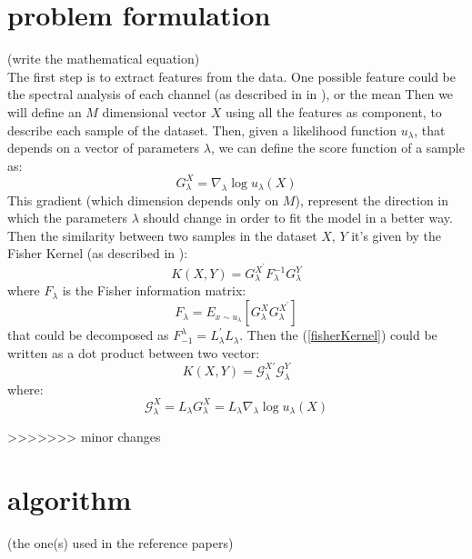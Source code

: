 \documentclass[final,leqno,onefignum,onetabnum]{siamltexmm}
\begin{document}
\section{problem formulation}
(write the mathematical equation)\\
The first step is to extract features from the data. One possible feature could be the spectral analysis of each channel (as described in in \cite{features1}), or the mean  Then we will define an $M$ dimensional vector $X$ using all the features as component, to describe each sample of the dataset. Then, given a likelihood function $u_\lambda$, that depends on  a vector of parameters $\lambda$, we can define the score function of a sample as:
\begin{equation}\label{Glambda}
G_\lambda^X=\nabla_{\lambda }\log u_\lambda(X)  
\end{equation}
This gradient (which dimension depends only on $M$), represent the direction in which the parameters $\lambda$ should change in order to fit the model in a better way.
Then the similarity between two samples in the dataset $X$, $Y$ it's given by the Fisher Kernel (as described in \cite{fisher}):
\begin{equation}\label{fisherKernel}
K(X,Y)=G_\lambda^{X^{'}}F_\lambda^{-1} G_\lambda^Y
\end{equation} 
where $F_\lambda$ is the Fisher information matrix:
\begin{equation}
F_\lambda=E_{x\sim u_\lambda}[ G_\lambda^XG_\lambda^{X^{'}}]
\end{equation} 
that could be decomposed as $F_{-1}^\lambda=L_\lambda^{'}L_\lambda$. Then the (\ref{fisherKernel}) could be written as a dot product between two vector:
$$
K(X,Y)=\mathcal{G}_\lambda^{X'}\mathcal{G}_\lambda^{Y}
$$ 
where:
$$
\mathcal{G}_\lambda^{X}=L_\lambda G_\lambda^X=L_\lambda \nabla_{\lambda }\log u_\lambda(X)  
$$

>>>>>>> minor changes





  \section{algorithm}
  (the one(s) used in the reference papers)
\end{document}
